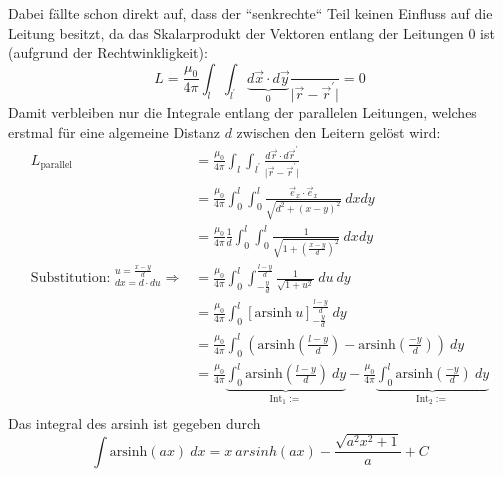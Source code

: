 \documentclass[11pt a4paper]{article}
\newcommand{\arsinh}{\text{arsinh}}
\begin{document}
Dabei fällte schon direkt auf, dass der ``senkrechte`` Teil keinen Einfluss auf die Leitung besitzt, da das 
Skalarprodukt der Vektoren entlang der Leitungen 0 ist (aufgrund der Rechtwinkligkeit):
\[ 	
	L = \frac{\mu_0}{4\pi} \int_{l} 
	\int_{l^\prime} \underbrace{d\vec x \cdot d\vec y}_{0} \frac{}{\vert \vec r - \vec r^\prime \vert}
	= 0
\]
Damit verbleiben nur die Integrale entlang der parallelen Leitungen, welches erstmal für eine algemeine Distanz
$d$ zwischen den Leitern gelöst wird:
\begin{align*}
	L_\text{parallel} 
	&= \frac{\mu_0}{4\pi} \int_l \int_{l^\prime} 
	\frac{d\vec r \cdot d\vec r^\prime}{\vert \vec r - \vec r^\prime \vert} \\
	&= \frac{\mu_0}{4\pi} \int_0^l \int_0^l
	\frac{\vec e_x \cdot \vec e_x}{\sqrt{d^2 + (x-y)^2}} \ dx dy \\
	&= \frac{\mu_0}{4\pi} \frac 1d \int_0^l \int_0^l
	\frac{1}{\sqrt{1 + \left( \frac{x-y}{d} \right) ^2}} \ dx dy \\
	\text{Substitution: } ^{u = \frac{x-y}{d}} _{dx = d \cdot du} \Rightarrow
	&= \frac{\mu_0}{4\pi} \int_0^l \int_{-\frac yd}^{\frac{l-y}{d}}
	\frac{1}{\sqrt{1 + u^2}} \ du \ dy \\
	&= \frac{\mu_0}{4\pi} \int_0^l 
	\left[ \arsinh \ u \right]_{-\frac yd}^{\frac{l-y}{d}}
	 \ dy \\
	&= \frac{\mu_0}{4\pi} \int_0^l 
	\left( \arsinh \left(\frac{l-y}{d}\right) - \arsinh \left(\frac{-y}{d} \right) \right)
	 \ dy \\
	&= \frac{\mu_0}{4\pi} \underbrace{\int_0^l 
	\arsinh \left(\frac{l-y}{d}\right) \ dy}_{\text{Int}_1 :=}
	- \frac{\mu_0}{4\pi} \underbrace{\int_0^l \arsinh \left(\frac{-y}{d} \right) \ dy}_{\text{Int}_2 := } \\
\end{align*}
Das integral des arsinh ist gegeben durch
\[ \int \arsinh(ax) \ dx = x \ arsinh(ax) - \frac{\sqrt{a^2x^2 + 1}}{a} + C \]
\end{document}
